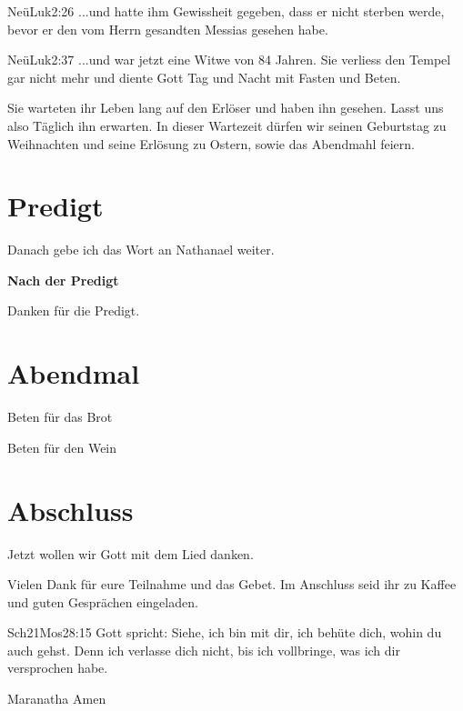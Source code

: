 \documentclass{../inc/mybib}
\begin{document}
\begin{spacing}{1.5}
\begin{bibelbox}{Neü}{Luk}{2:26}
...und hatte ihm Gewissheit gegeben, dass er nicht sterben werde, bevor er den vom Herrn gesandten Messias gesehen habe.
\end{bibelbox}

\begin{bibelbox}{Neü}{Luk}{2:37}
...und war jetzt eine Witwe von 84 Jahren. Sie verliess den Tempel gar nicht mehr und diente Gott Tag und Nacht mit Fasten und Beten.
\end{bibelbox}

Sie warteten ihr Leben lang auf den Erlöser und haben ihn gesehen. Lasst uns also Täglich ihn erwarten. In dieser Wartezeit dürfen wir seinen Geburtstag zu Weihnachten und seine Erlösung zu Ostern, sowie das Abendmahl feiern.

\end{spacing}


\section{Predigt}

Danach gebe ich das Wort an Nathanael weiter.

\textbf{Nach der Predigt}

Danken für die Predigt.

\section{Abendmal}

Beten für das Brot


Beten für den Wein



\section{Abschluss}

Jetzt wollen wir Gott mit dem Lied  danken.


Vielen Dank für eure Teilnahme und das Gebet. Im Anschluss seid ihr zu Kaffee und guten Gesprächen eingeladen.
\beten{}

\begin{bibelbox}{Sch2}{1Mos}{28:15}
Gott spricht: Siehe, ich bin mit dir,
ich behüte dich, wohin du auch gehst.
Denn ich verlasse dich nicht,
bis ich vollbringe, was ich dir versprochen habe.
\end{bibelbox}

Maranatha Amen
\end{document}
